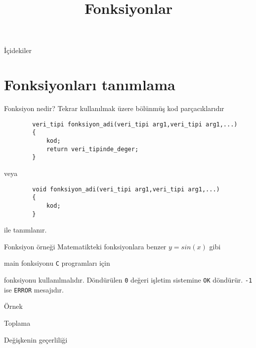 
\title[Ders 2] {Fonksiyonlar}

\frame{\titlepage}
\begin{frame}[fragile]{İçidekiler}
    \tableofcontents
\end{frame}
\section{Fonksiyonları tanımlama}
\begin{frame}[fragile]{Fonksiyon nedir?}
    Tekrar kullanılmak üzere bölünmüş kod parçacıklarıdır
    \begin{lstlisting}
        veri_tipi fonksiyon_adi(veri_tipi arg1,veri_tipi arg1,...)
        {
            kod;
            return veri_tipinde_deger;
        }\end{lstlisting}
    veya
    \begin{lstlisting}
        void fonksiyon_adi(veri_tipi arg1,veri_tipi arg1,...)
        {
            kod;
        }\end{lstlisting}
    ile tanımlanır.
\end{frame}
\begin{frame}[fragile]{Fonksiyon örneği}
    Matematikteki fonksiyonlara benzer $y=sin(x)$ gibi
    
\end{frame}
\begin{frame}[fragile]{main fonksiyonu}
    \lstinline{C} programları için 
    
    fonksiyonu kullanılmalıdır. Döndürülen \verb|0| değeri işletim sistemine \verb|OK| döndürür. \verb|-1| ise \verb|ERROR| mesajıdır.
\end{frame}
\begin{frame}[fragile]{Örnek}
    
\end{frame}
\begin{frame}[fragile]{Toplama}
    
\end{frame}
\begin{frame}[fragile]{Değişkenin geçerliliği}
    
\end{frame}
